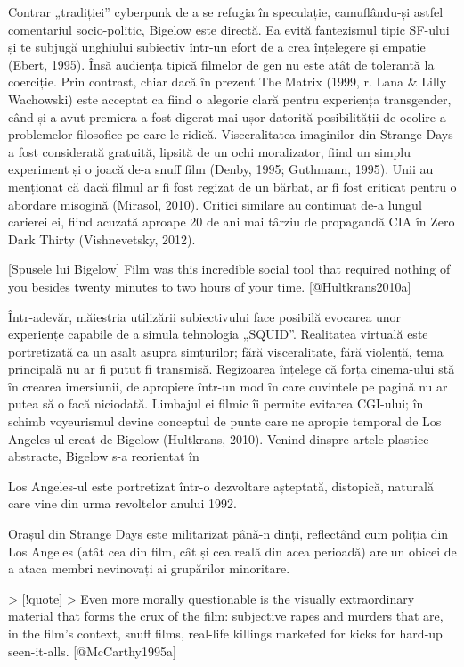 \documentclass[a4paper, 12pt]{article}
\begin{document}
Contrar „tradiției” cyberpunk de a se refugia în speculație, camuflându-și astfel comentariul socio-politic, Bigelow este directă. Ea evită fantezismul tipic SF-ului și te subjugă unghiului subiectiv într-un efort de a crea înțelegere și empatie (Ebert, 1995). Însă audiența tipică filmelor de gen nu este atât de tolerantă la coerciție. Prin contrast, chiar dacă în prezent The Matrix (1999, r. Lana & Lilly Wachowski) este acceptat ca fiind o alegorie clară pentru experiența transgender, când și-a avut premiera a fost digerat mai ușor datorită posibilității de ocolire a problemelor filosofice pe care le ridică. Visceralitatea imaginilor din Strange Days a fost considerată gratuită, lipsită de un ochi moralizator, fiind un simplu experiment și o joacă de-a snuff film (Denby, 1995; Guthmann, 1995). Unii au menționat că dacă filmul ar fi fost regizat de un bărbat, ar fi fost criticat pentru o abordare misogină (Mirasol, 2010). Critici similare au continuat de-a lungul carierei ei, fiind acuzată aproape 20 de ani mai târziu de propagandă CIA în Zero Dark Thirty (Vishnevetsky, 2012).

[Spusele lui Bigelow] Film was this incredible social tool that required nothing of you besides twenty minutes to two hours of your time. [@Hultkrans2010a]

Într-adevăr, măiestria utilizării subiectivului face posibilă evocarea unor experiențe capabile de a simula tehnologia „SQUID”. Realitatea virtuală este portretizată ca un asalt asupra simțurilor; fără visceralitate, fără violență, tema principală nu ar fi putut fi transmisă. Regizoarea înțelege că forța cinema-ului stă în crearea imersiunii, de apropiere într-un mod în care cuvintele pe pagină nu ar putea să o facă niciodată. Limbajul ei filmic îi permite evitarea CGI-ului; în schimb voyeurismul devine conceptul de punte care ne apropie temporal de Los Angeles-ul creat de Bigelow (Hultkrans, 2010). Venind dinspre artele plastice abstracte, Bigelow s-a reorientat în 

Los Angeles-ul este portretizat într-o dezvoltare așteptată, distopică, naturală care vine din urma revoltelor anului 1992. 

Orașul din Strange Days este militarizat până-n dinți, reflectând cum poliția din Los Angeles (atât cea din film, cât și cea reală din acea perioadă) are un obicei de a ataca membri nevinovați ai grupărilor minoritare.

> [!quote]
> Even more morally questionable is the visually extraordinary material that forms the crux of the film: subjective rapes and murders that are, in the film’s context, snuff films, real-life killings marketed for kicks for hard-up seen-it-alls. [@McCarthy1995a]
\end{document}

